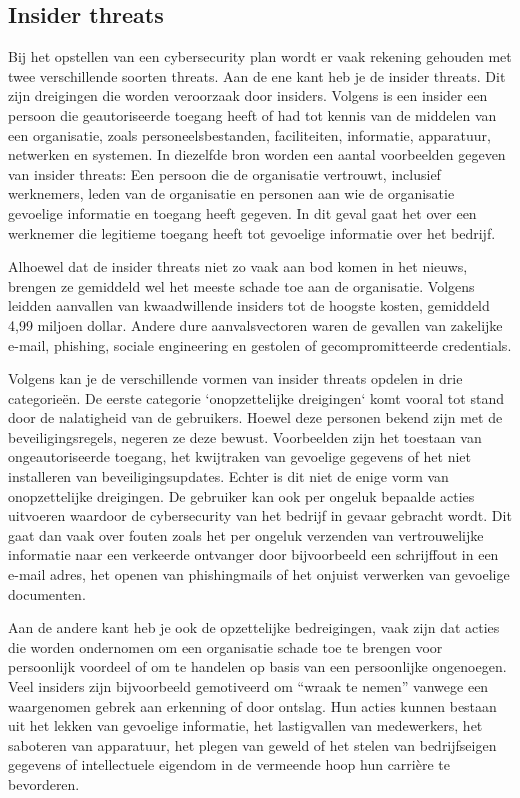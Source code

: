 \subsection{Insider threats}
Bij het opstellen van een cybersecurity plan wordt er vaak rekening gehouden met twee verschillende soorten threats. Aan de ene kant heb je de insider threats. Dit zijn dreigingen die worden veroorzaak door insiders. Volgens \textcite{Cisa2025} is een insider een persoon die geautoriseerde toegang heeft of had tot kennis van de middelen van een organisatie, zoals personeelsbestanden, faciliteiten, informatie, apparatuur, netwerken en systemen. In diezelfde bron worden een aantal voorbeelden gegeven van insider threats: Een persoon die de organisatie vertrouwt, inclusief werknemers, leden van de organisatie en personen aan wie de organisatie gevoelige informatie en toegang heeft gegeven. In dit geval gaat het over een werknemer die legitieme toegang heeft tot gevoelige informatie over het bedrijf.

Alhoewel dat de insider threats niet zo vaak aan bod komen in het nieuws, brengen ze gemiddeld wel het meeste schade toe aan de organisatie. Volgens \textcite{ibm2024} leidden aanvallen van kwaadwillende insiders tot de hoogste kosten, gemiddeld 4,99 miljoen dollar. Andere dure aanvalsvectoren waren de gevallen van zakelijke e-mail, phishing, sociale engineering en gestolen of gecompromitteerde credentials. 

Volgens \textcite{Cisa2025} kan je de verschillende vormen van insider threats opdelen in drie categorieën. De eerste categorie `onopzettelijke dreigingen` komt vooral tot stand door de nalatigheid van de gebruikers.  Hoewel deze personen bekend zijn met de beveiligingsregels, negeren ze deze bewust. Voorbeelden zijn het toestaan van ongeautoriseerde toegang, het kwijtraken van gevoelige gegevens of het niet installeren van beveiligingsupdates. Echter is dit niet de enige vorm van onopzettelijke dreigingen. De gebruiker kan ook per ongeluk bepaalde acties uitvoeren waardoor de cybersecurity van het bedrijf in gevaar gebracht wordt. Dit gaat dan vaak over fouten zoals het per ongeluk verzenden van vertrouwelijke informatie naar een verkeerde ontvanger door bijvoorbeeld een schrijffout in een e-mail adres, het openen van phishingmails of het onjuist verwerken van gevoelige documenten.

Aan de andere kant heb je ook de opzettelijke bedreigingen, vaak zijn dat acties die worden ondernomen om een organisatie schade toe te brengen voor persoonlijk voordeel of om te handelen op basis van een persoonlijke ongenoegen. Veel insiders zijn bijvoorbeeld gemotiveerd om “wraak te nemen” vanwege een waargenomen gebrek aan erkenning of door ontslag. Hun acties kunnen bestaan uit het lekken van gevoelige informatie, het lastigvallen van medewerkers, het saboteren van apparatuur, het plegen van geweld of het stelen van bedrijfseigen gegevens of intellectuele eigendom in de vermeende hoop hun carrière te bevorderen.\autocite{Cisa2025}

